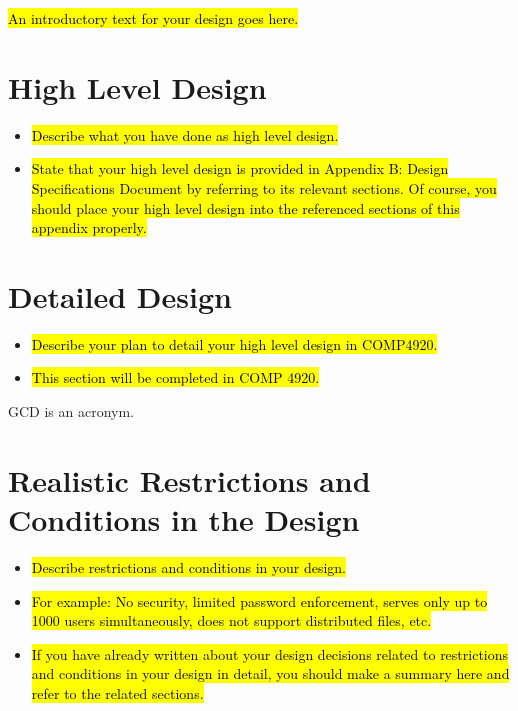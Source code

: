 \hl{An introductory text for your design goes here.}


\section{High Level Design}

\begin{itemize}
	\item \hl{Describe what you have done as high level design.}
	\item \hl{State that your high level design is provided in Appendix B: Design Specifications Document by referring to its relevant sections. Of course, you should place your high level design into the referenced sections of this appendix properly.}
\end{itemize}


\section{Detailed Design}

\begin{itemize}
	\item \hl{Describe your plan to detail your high level design in COMP4920.}
	\item \hl{This section will be completed in COMP 4920.}
\end{itemize}


\ac{GCD} is an acronym.

\section{Realistic Restrictions and Conditions in the Design}

\begin{itemize}
	\item \hl{Describe restrictions and conditions in your design.}
	\item \hl{For example: No security, limited password enforcement, serves only up to 1000 users simultaneously, does not support distributed files, etc.}
	\item \hl{If you have already written about your design decisions related to restrictions and conditions in your design in detail, you should make a summary here and refer to the related sections.}
\end{itemize}

